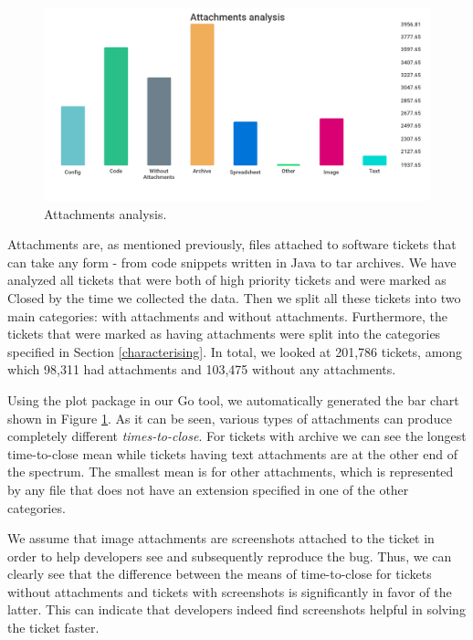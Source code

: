\documentclass{mpaper}
\begin{document}
\begin{figure}[ht]
  \begin{center}
  \includegraphics[scale=0.23]{images/attachments.png}
  \end{center}
  \caption{\label{attachments}Attachments analysis.}
\end{figure}

Attachments are, as mentioned previously, files attached to software tickets that can take any form - from code 
snippets written in Java to tar archives. We have analyzed all tickets that were both of high priority tickets and
were marked as Closed by the time we collected the data. Then we split all these tickets into two main categories: 
with attachments and without attachments. Furthermore, the tickets that were marked as having attachments were split 
into the categories specified in Section \ref{characterising}. In total, we looked at 201,786 tickets, among which 
98,311 had attachments and 103,475 without any attachments.

Using the plot package in our Go tool, we automatically generated the bar chart shown in Figure \ref{attachments}. 
As it can be seen, various types of attachments can produce completely different \emph{times-to-close}. For 
tickets with archive we can see the longest time-to-close mean while tickets having text attachments are at 
the other end of the spectrum. The smallest mean is for other attachments, which is represented by any file 
that does not have an extension specified in one of the other categories. 

We assume that image attachments are screenshots attached to the ticket in order to help developers see and 
subsequently reproduce the bug. Thus, we can clearly see that the difference between the means of time-to-close 
for tickets without attachments and tickets with screenshots is significantly in favor of the latter. This can 
indicate that developers indeed find screenshots helpful in solving the ticket faster.
\end{document}
